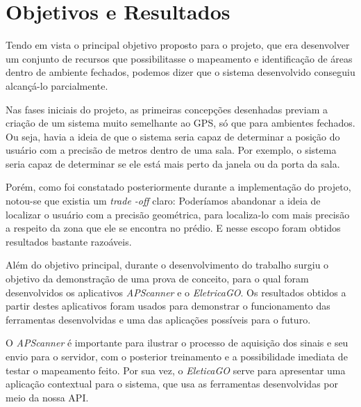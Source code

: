 \section{Objetivos e Resultados}
Tendo em vista o principal objetivo proposto para o projeto, que era desenvolver um conjunto de recursos que possibilitasse o mapeamento e identificação de áreas dentro de ambiente fechados, podemos dizer que o sistema desenvolvido conseguiu alcançá-lo parcialmente.\par
Nas fases iniciais do projeto, as primeiras concepções desenhadas previam a criação de um sistema muito semelhante ao GPS, só que para ambientes fechados. Ou seja, havia a ideia de que o sistema seria capaz de determinar a posição do usuário com a precisão de metros dentro de uma sala. Por exemplo, o sistema seria capaz de determinar se ele está mais perto da janela ou da porta da sala.\par
Porém, como foi constatado posteriormente durante a implementação do projeto, notou-se que existia um \textit{trade -off} claro: Poderíamos abandonar a ideia de localizar o usuário com a precisão geométrica, para localiza-lo com mais precisão a respeito da zona que ele se encontra no prédio. E nesse escopo foram obtidos resultados bastante razoáveis.\par
Além do objetivo principal, durante o desenvolvimento do trabalho surgiu o objetivo da demonstração de uma prova de conceito, para o qual foram desenvolvidos os aplicativos \textit{APScanner} e o \textit{EletricaGO}. Os resultados obtidos a partir destes aplicativos foram usados para demonstrar o funcionamento das ferramentas desenvolvidas e uma das aplicações possíveis para o futuro.\par
O \textit{APScanner} é importante para ilustrar o processo de aquisição dos sinais e seu envio para o servidor, com o posterior treinamento e a possibilidade imediata de testar o mapeamento feito. Por sua vez, o \textit{EleticaGO} serve para apresentar uma aplicação contextual para o sistema, que usa as ferramentas desenvolvidas por meio da nossa API. \par



